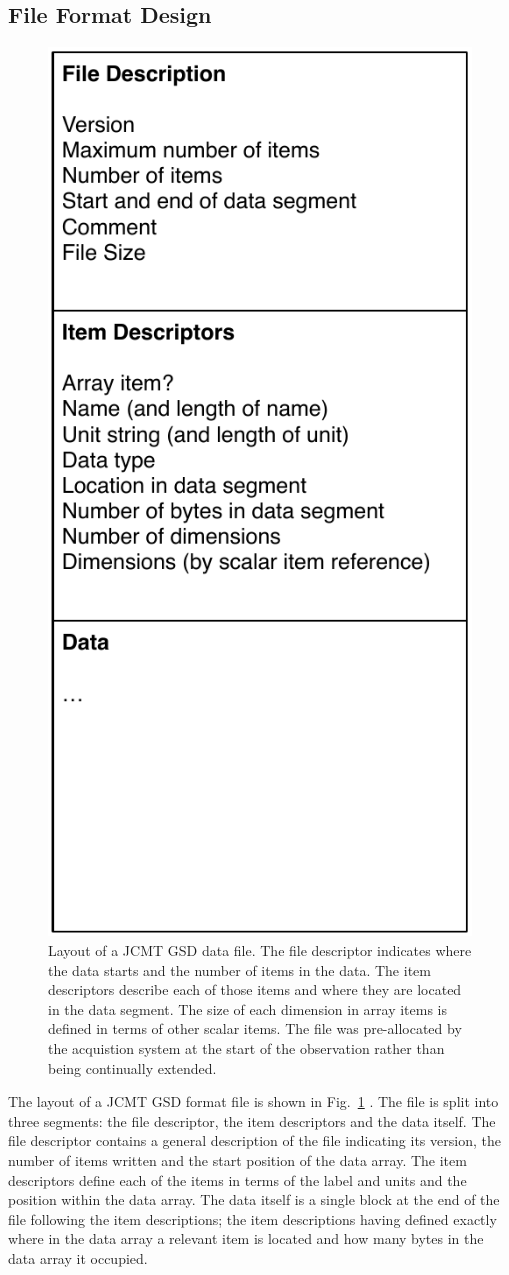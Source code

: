 \documentclass[final,authoryear,5p,times,twocolumn]{elsarticle}
\begin{document}
\subsection{File Format Design}

\begin{figure}[t]
\begin{center}
\includegraphics[width=0.5\columnwidth]{gsd-file-layout}
\end{center}
\caption{Layout of a JCMT GSD data file. The file descriptor indicates
where the data starts and the number of items in the data. The item
descriptors describe each of those items and where they are located in
the data segment. The size of each dimension in array items is defined
in terms of other scalar items. The file was pre-allocated by the
acquistion system at the start of the observation rather than being
continually extended.}
\label{fig:jcmtgsd}
\end{figure}

The layout of a JCMT GSD format file is shown in
Fig.~\ref{fig:jcmtgsd} \citep[see also][]{mtdn84}. The file is split
into three segments: the file descriptor, the item descriptors and the
data itself. The file descriptor contains a general description of the
file indicating its version, the number of items written and the start
position of the data array. The item descriptors define each of the
items in terms of the label and units and the position within the data
array. The data itself is a single block at the end of the file
following the item descriptions; the item descriptions having defined
exactly where in the data array a relevant item is located and how
many bytes in the data array it occupied.
\end{document}
